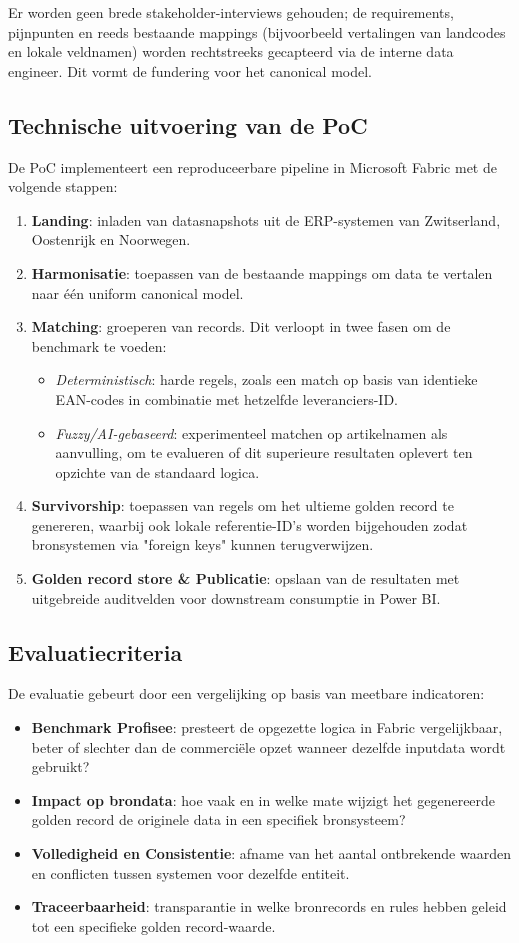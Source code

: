 Er worden geen brede stakeholder-interviews gehouden; de requirements, pijnpunten en reeds bestaande mappings (bijvoorbeeld vertalingen van landcodes en lokale veldnamen) worden rechtstreeks gecapteerd via de interne data engineer. Dit vormt de fundering voor het canonical model.

\subsection{Technische uitvoering van de PoC}
De PoC implementeert een reproduceerbare pipeline in Microsoft Fabric met de volgende stappen:
\begin{enumerate}
  \item \textbf{Landing}: inladen van datasnapshots uit de ERP-systemen van Zwitserland, Oostenrijk en Noorwegen.
  \item \textbf{Harmonisatie}: toepassen van de bestaande mappings om data te vertalen naar één uniform canonical model.
  \item \textbf{Matching}: groeperen van records. Dit verloopt in twee fasen om de benchmark te voeden:
  \begin{itemize}
      \item \emph{Deterministisch}: harde regels, zoals een match op basis van identieke EAN-codes in combinatie met hetzelfde leveranciers-ID.
      \item \emph{Fuzzy/AI-gebaseerd}: experimenteel matchen op artikelnamen als aanvulling, om te evalueren of dit superieure resultaten oplevert ten opzichte van de standaard logica.
  \end{itemize}
  \item \textbf{Survivorship}: toepassen van regels om het ultieme golden record te genereren, waarbij ook lokale referentie-ID's worden bijgehouden zodat bronsystemen via "foreign keys" kunnen terugverwijzen.
  \item \textbf{Golden record store \& Publicatie}: opslaan van de resultaten met uitgebreide auditvelden voor downstream consumptie in Power BI.
\end{enumerate}

\subsection{Evaluatiecriteria}
De evaluatie gebeurt door een vergelijking op basis van meetbare indicatoren:
\begin{itemize}
  \item \textbf{Benchmark Profisee}: presteert de opgezette logica in Fabric vergelijkbaar, beter of slechter dan de commerciële opzet wanneer dezelfde inputdata wordt gebruikt?
  \item \textbf{Impact op brondata}: hoe vaak en in welke mate wijzigt het gegenereerde golden record de originele data in een specifiek bronsysteem?
  \item \textbf{Volledigheid en Consistentie}: afname van het aantal ontbrekende waarden en conflicten tussen systemen voor dezelfde entiteit.
  \item \textbf{Traceerbaarheid}: transparantie in welke bronrecords en rules hebben geleid tot een specifieke golden record-waarde.
\end{itemize}

